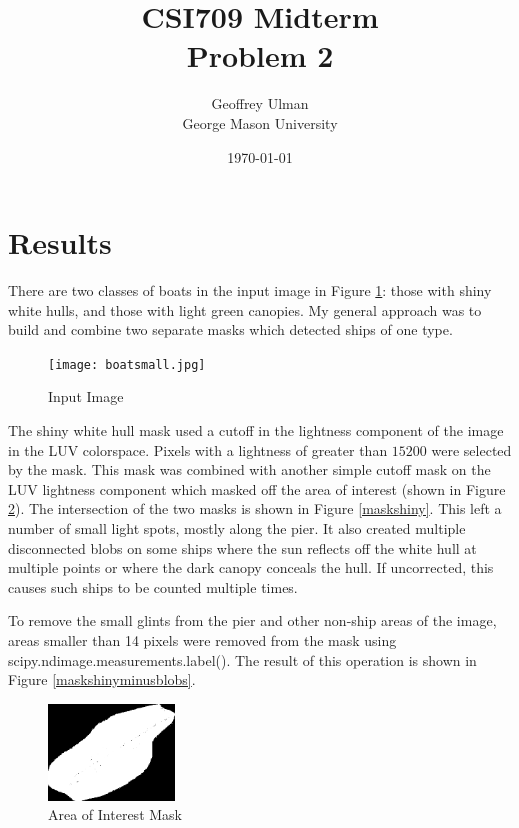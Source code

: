 \documentclass[12pt]{article}
\begin{document}
\title{CSI709 Midterm \\
Problem 2}
\author{
        Geoffrey Ulman \\
        George Mason University\\
}
\date{\today}

\maketitle

\section{Results}

There are two classes of boats in the input image in Figure \ref{boats}: those with shiny white hulls, and those with light green canopies. My general approach was to build and combine two separate masks which detected ships of one type.

\begin{figure}
\centering
\texttt{[image: boatsmall.jpg]}
\caption{Input Image}
\label{boats}
\end{figure}

The shiny white hull mask used a cutoff in the lightness component of the image in the LUV colorspace. Pixels with a lightness of greater than \(15200\) were selected by the mask. This mask was combined with another simple cutoff mask on the LUV lightness component which masked off the area of interest (shown in Figure \ref{bordermask}). The intersection of the two masks is shown in Figure \ref{maskshiny}. This left a number of small light spots, mostly along the pier. It also created multiple disconnected blobs on some ships where the sun reflects off the white hull at multiple points or where the dark canopy conceals the hull. If uncorrected, this causes such ships to be counted multiple times.

To remove the small glints from the pier and other non-ship areas of the image, areas smaller than 14 pixels were removed from the mask using scipy.ndimage.measurements.label(). The result of this operation is shown in Figure \ref{maskshinyminusblobs}.

\begin{figure}
\centering
\includegraphics[width=0.30\textwidth]{border_mask.png}
\caption{Area of Interest Mask}
\label{bordermask}
\end{figure}
\end{document}
